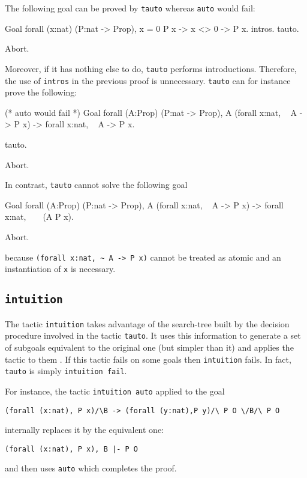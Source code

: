 \begin{coq_example*}
The following goal can be proved by {\tt tauto} whereas {\tt auto}
would fail:

\begin{coq_example}
Goal forall (x:nat) (P:nat -> Prop), x = 0 \/ P x -> x <> 0 -> P x.
  intros.
  tauto.
\end{coq_example}
\begin{coq_eval}
Abort.
\end{coq_eval}

Moreover, if it has nothing else to do, {\tt tauto} performs
introductions. Therefore, the use of {\tt intros} in the previous
proof is unnecessary. {\tt tauto} can for instance prove the
following:
\begin{coq_example}
(* auto would fail *)
Goal forall (A:Prop) (P:nat -> Prop),
    A \/ (forall x:nat, ~ A -> P x) -> forall x:nat, ~ A -> P x.

  tauto.
\end{coq_example}
\begin{coq_eval}
Abort.
\end{coq_eval}

\Rem In contrast, {\tt tauto} cannot solve the following goal

\begin{coq_example*}
Goal forall (A:Prop) (P:nat -> Prop),
    A \/ (forall x:nat, ~ A -> P x) -> forall x:nat, ~ ~ (A \/ P x).
\end{coq_example*}
\begin{coq_eval}
Abort.
\end{coq_eval}

because \verb=(forall x:nat, ~ A -> P x)= cannot be treated as atomic and an
instantiation of \verb=x= is necessary.

\subsection{\tt intuition {\tac}
\label{intuition}}

The tactic \texttt{intuition} takes advantage of the search-tree built
by the decision procedure involved in the tactic {\tt tauto}. It uses
this information to generate a set of subgoals equivalent to the
original one (but simpler than it) and applies the tactic
{\tac} to them \cite{Mun94}. If this tactic fails on some goals then
{\tt intuition} fails. In fact, {\tt tauto} is simply {\tt intuition
  fail}.

For instance, the tactic {\tt intuition auto} applied to the goal
\begin{verbatim}
(forall (x:nat), P x)/\B -> (forall (y:nat),P y)/\ P O \/B/\ P O
\end{verbatim}
internally replaces it by the equivalent one:
\begin{verbatim}
(forall (x:nat), P x), B |- P O
\end{verbatim}
and then uses {\tt auto} which completes the proof.


\end{coq_example*}
